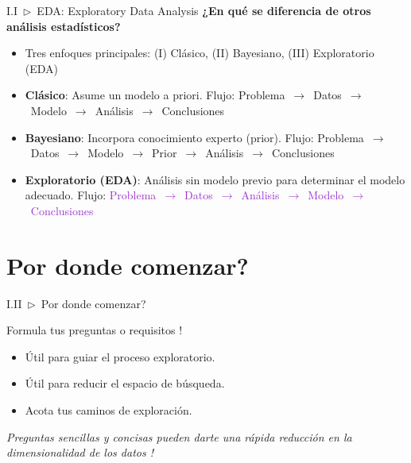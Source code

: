 \documentclass[xcolor=dvipsnames]{beamer}
\begin{document}
    \begin{frame}{I.I~$\rhd$~EDA: Exploratory Data Analysis}
        \textbf{¿En qué se diferencia de otros análisis estadísticos?}
        \vspace{3mm}
        \begin{itemize}
            \item Tres enfoques principales: (I) Clásico, (II) Bayesiano, (III) Exploratorio (EDA)
            \vspace{2mm}
            \item \textbf{Clásico}: Asume un modelo a priori. Flujo: Problema~$\rightarrow$~Datos~$\rightarrow$~Modelo~$\rightarrow$~Análisis~$\rightarrow$~Conclusiones
            \item \textbf{Bayesiano}: Incorpora conocimiento experto (prior). Flujo: Problema~$\rightarrow$~Datos~$\rightarrow$~Modelo~$\rightarrow$~Prior~$\rightarrow$~Análisis~$\rightarrow$~Conclusiones
            \item \textbf{Exploratorio (EDA)}: Análisis sin modelo previo para determinar el modelo adecuado. Flujo: \textcolor{DarkOrchid}{Problema~$\rightarrow$~Datos~$\rightarrow$~Análisis~$\rightarrow$~Modelo~$\rightarrow$~Conclusiones}
        \end{itemize} 
    \end{frame}

    \section{Por donde comenzar?}
    \begin{frame}{I.II~$\rhd$~Por donde comenzar?}
        \begin{block}{Formula tus preguntas o requisitos !}
        \begin{itemize}
            \item Útil para guiar el proceso exploratorio.
            \item Útil para reducir el espacio de búsqueda.
            \item Acota tus caminos de exploración.
        \end{itemize}
        \end{block}
        \vspace{5mm}
        \textit{Preguntas sencillas y concisas pueden darte una rápida reducción en la dimensionalidad de los datos !}     
    \end{frame}
\end{document}
